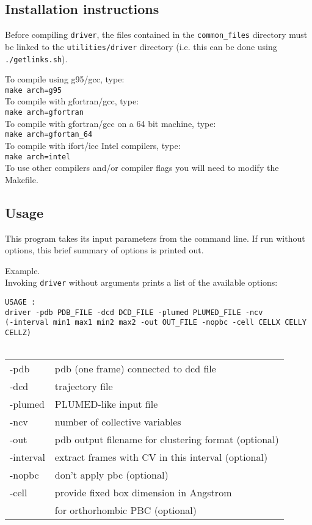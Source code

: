 \documentclass[12pt,fleqn]{report}
\newcommand{\esempio}[1]{
\vspace{10pt}
\begin{flushright}
\colorbox{light-gray}{
   \begin{minipage}{13cm}
       \scriptsize{
{\fontfamily{phv} \fontseries{b}
 \selectfont Example. \\
 \fontseries{m} \selectfont #1 } }
\end{minipage}}
\end{flushright}
\vspace{20pt}
}
\begin{document}
\subsection{Installation instructions}
Before compiling {\tt driver}, the files
contained in the {\tt common\_files} directory must be linked to the 
{\tt utilities/driver} directory (i.e. this can be done using {\tt ./getlinks.sh}).

To compile using g95/gcc, type:
\vspace {5pt} \\
{\tt make arch=g95}
\vspace {5pt}\\
To compile with gfortran/gcc, type:
\vspace {5pt}\\
{\tt make arch=gfortran}
\vspace {5pt}\\
To compile with gfortran/gcc on a 64 bit machine, type:
\vspace {5pt}\\
{\tt make arch=gfortan\_64}
\vspace {5pt}\\
To compile with ifort/icc Intel compilers, type:
\vspace {5pt}\\
{\tt make arch=intel}
\vspace {5pt}\\

To use other compilers and/or compiler flags you will need to modify the Makefile.

\subsection{Usage}

This program takes its input parameters from the command line. If run 
without options, this brief summary of options is printed out. 

\esempio{Invoking {\tt driver} without arguments prints a list of the available options: \vspace{10pt} \\
{\tt USAGE : \\
 driver -pdb PDB\_FILE -dcd DCD\_FILE -plumed PLUMED\_FILE -ncv  \\
          (-interval min1 max1 min2 max2 -out OUT\_FILE -nopbc -cell CELLX CELLY CELLZ)\\
 \\
 \begin{tabular}{ l l }
 -pdb      &  pdb (one frame) connected to dcd file\\
 -dcd      &  trajectory file\\
 -plumed    & PLUMED-like input file\\
 -ncv        & number of collective variables\\
 -out        & pdb output filename for clustering format (optional)\\
 -interval   & extract frames with CV in this interval (optional)\\
  -nopbc      & don't apply pbc                                   (optional) \\
 -cell       & provide fixed box dimension in Angstrom \\
& for orthorhombic PBC  (optional)
\end{tabular}
 }
}
\end{document}
